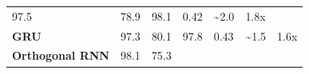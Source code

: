 \documentclass[
  12pt,
]{article}
\begin{document}
\begin{longtable}[]{@{}lllllll@{}}
\begin{minipage}[t]{0.12\columnwidth}
97.5\strut
\end{minipage} & \begin{minipage}[t]{0.12\columnwidth}\raggedright
78.9\strut
\end{minipage} & \begin{minipage}[t]{0.12\columnwidth}\raggedright
98.1\strut
\end{minipage} & \begin{minipage}[t]{0.12\columnwidth}\raggedright
0.42\strut
\end{minipage} & \begin{minipage}[t]{0.12\columnwidth}\raggedright
\textasciitilde2.0\strut
\end{minipage} & \begin{minipage}[t]{0.12\columnwidth}\raggedright
1.8x\strut
\end{minipage}\tabularnewline
\begin{minipage}[t]{0.12\columnwidth}\raggedright
\textbf{GRU}\strut
\end{minipage} & \begin{minipage}[t]{0.12\columnwidth}\raggedright
97.3\strut
\end{minipage} & \begin{minipage}[t]{0.12\columnwidth}\raggedright
80.1\strut
\end{minipage} & \begin{minipage}[t]{0.12\columnwidth}\raggedright
97.8\strut
\end{minipage} & \begin{minipage}[t]{0.12\columnwidth}\raggedright
0.43\strut
\end{minipage} & \begin{minipage}[t]{0.12\columnwidth}\raggedright
\textasciitilde1.5\strut
\end{minipage} & \begin{minipage}[t]{0.12\columnwidth}\raggedright
1.6x\strut
\end{minipage}\tabularnewline
\begin{minipage}[t]{0.12\columnwidth}\raggedright
\textbf{Orthogonal RNN}\strut
\end{minipage} & \begin{minipage}[t]{0.12\columnwidth}\raggedright
98.1\strut
\end{minipage} & \begin{minipage}[t]{0.12\columnwidth}\raggedright
75.3\strut
\end{minipage} & \begin{minipage}[t]{0.12\columnwidth}\raggedright

\end{minipage}
\end{longtable}
\end{document}

